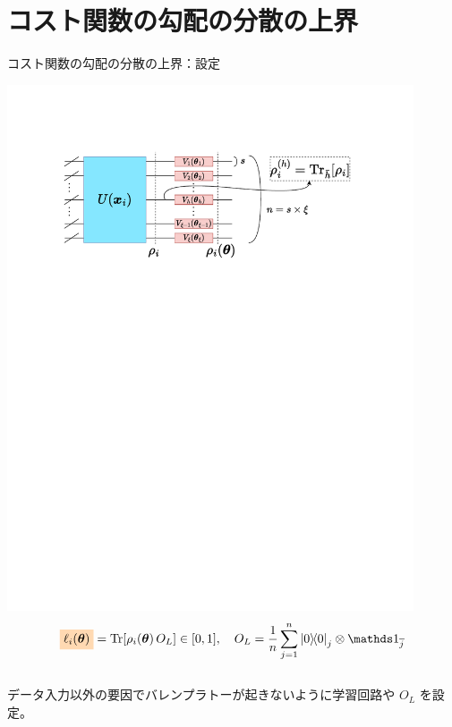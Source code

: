 \documentclass[dvipdfmx,10pt,aspectratio=169]{beamer}
\begin{document}
\section{コスト関数の勾配の分散の上界}
\begin{frame}{コスト関数の勾配の分散の上界：設定}

    \centering\includegraphics[width=12cm]{setting.pdf}
    $$
    \colorbox{orange!30}{$\ell_i(\bth)$} = \Tr[\rho_i(\bth)\,O_L] \in [0,1],
    \quad
    O_L=\frac1n \sum_{j=1}^{n}\dyad{0}_{j} \otimes \bbid_{\bar{j}}
    $$\\
    \vspace*{5pt}
    データ入力以外の要因でバレンプラトーが起きないように学習回路や $O_L$ を設定。
    

\end{frame}
\end{document}
